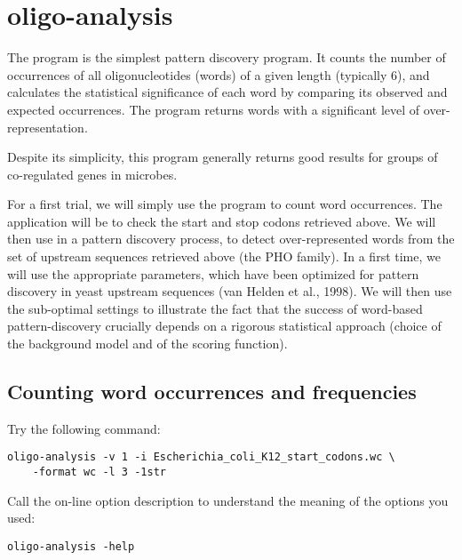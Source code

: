 \section{oligo-analysis}

The program  is the simplest pattern discovery
program. It counts the number of occurrences of all oligonucleotides
(words) of a given length (typically 6), and calculates the
statistical significance of each word by comparing its observed and
expected occurrences. The program returns words with a significant
level of over-representation.

Despite its simplicity, this program generally returns good results
for groups of co-regulated genes in microbes.

For a first trial, we will simply use the program to count word
occurrences. The application will be to check the start and stop
codons retrieved above. We will then use  in a
pattern discovery process, to detect over-represented words from the
set of upstream sequences retrieved above (the PHO family).  In a
first time, we will use the appropriate parameters, which have been
optimized for pattern discovery in yeast upstream sequences (van
Helden et al., 1998). We will then use the sub-optimal settings to
illustrate the fact that the success of word-based pattern-discovery
crucially depends on a rigorous statistical approach (choice of the
background model and of the scoring function).

\subsection{Counting word occurrences and frequencies}

Try the following command:

{\color{Blue} \begin{footnotesize} 
\begin{verbatim}
oligo-analysis -v 1 -i Escherichia_coli_K12_start_codons.wc \
    -format wc -l 3 -1str
\end{verbatim} \end{footnotesize}
}


Call the on-line option description to understand the meaning of the
options you used:

{\color{Blue} \begin{footnotesize} 
\begin{verbatim}
oligo-analysis -help
\end{verbatim} \end{footnotesize}
}


